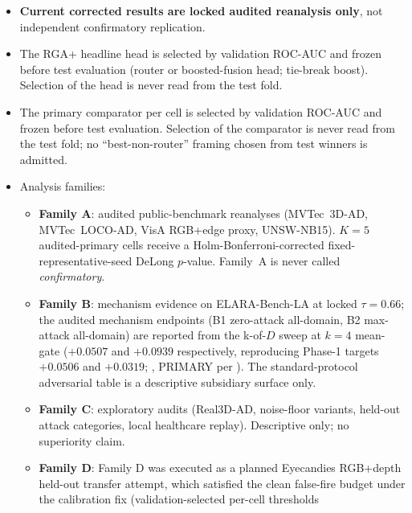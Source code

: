 \documentclass[11pt]{article}
\newcommand{\methodplus}{RGA+}
\newcommand{\benchmark}{ELARA-Bench-LA}
\begin{document}
\begin{itemize}
  \item \textbf{Current corrected results are locked audited
        reanalysis only}, not independent confirmatory replication.
  \item The \methodplus{} headline head is selected by validation
        ROC-AUC and frozen before test evaluation (router or
        boosted-fusion head; tie-break boost). Selection of the
        head is never read from the test fold.
  \item The primary comparator per cell is selected by validation
        ROC-AUC and frozen before test evaluation. Selection of the
        comparator is never read from the test fold; no
        ``best-non-router'' framing chosen from test winners is
        admitted.
  \item Analysis families:
        \begin{itemize}
          \item \textbf{Family A}: audited public-benchmark
                reanalyses (MVTec~3D-AD, MVTec~LOCO-AD, VisA RGB+edge
                proxy, UNSW-NB15). $K{=}5$ audited-primary cells
                receive a Holm-Bonferroni-corrected fixed-representative-seed
                DeLong $p$-value. Family~A is never called
                \emph{confirmatory}.
          \item \textbf{Family B}: mechanism evidence on
                \benchmark{} at locked $\tau{=}0.66$; the audited
                mechanism endpoints (B1 zero-attack all-domain,
                B2 max-attack all-domain) are reported from the
                k-of-$D$ sweep at $k{=}4$ mean-gate
                ($+0.0507$ and $+0.0939$ respectively, reproducing Phase-1 targets $+0.0506$ and $+0.0319$;
                ,
                PRIMARY per ).
                The standard-protocol adversarial table is a
                descriptive subsidiary surface only.
          \item \textbf{Family C}: exploratory audits (Real3D-AD,
                noise-floor variants, held-out attack categories,
                local healthcare replay). Descriptive only; no
                superiority claim.
          \item \textbf{Family D}: Family D was executed as a
                planned Eyecandies RGB+depth held-out transfer attempt,
                which satisfied the clean false-fire budget under the
                calibration fix (validation-selected per-cell thresholds

\end{itemize}
\end{itemize}
\end{document}
